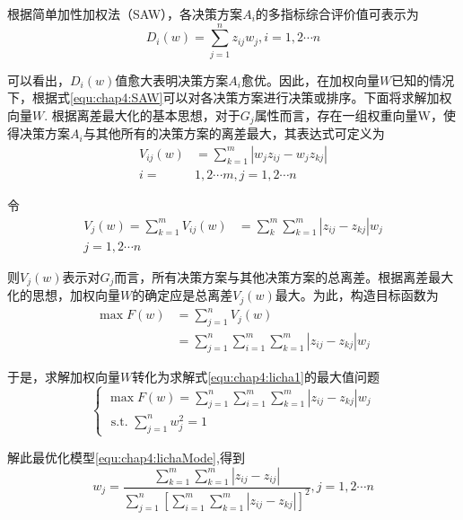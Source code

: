 根据简单加性加权法（SAW），各决策方案$A_i$的多指标综合评价值可表示为
\begin{equation}
\label{equ:chap4:SAW}
  D_i(w) = \sum_{j = 1}^{n} z_{ij}w_{j} , i=1,2 \cdots n
\end{equation}

可以看出，$D_i(w)$值愈大表明决策方案$A_i$愈优。因此，在加权向量$W$已知的情况下，根据式\ref{equ:chap4:SAW}可以对各决策方案进行决策或排序。下面将求解加权向量$W$.
根据离差最大化的基本思想，对于$G_j$属性而言，存在一组权重向量W，使得决策方案$A_{i}$与其他所有的决策方案的离差最大，其表达式可定义为
\begin{equation}
\begin{aligned} V_{i j}(w) &=\sum_{k=1}^{m}\left|w_{j} z_{i j}-w_{j} z_{k j}\right| \\ i=& 1,2 \cdots m, j=1,2 \cdots n \end{aligned}
\end{equation}

令
\begin{equation}
\begin{aligned} V_{j}(w)=\sum_{k=1}^{m} V_{i j}(w) &=\sum_{k}^{m} \sum_{k=1}^{m}\left|z_{i j}-z_{k j}\right| w_{j} \\ j=1,2 \cdots n \end{aligned}
\end{equation}

则$V_{j}(w)$表示对$G_{j}$而言，所有决策方案与其他决策方案的总离差。根据离差最大化的思想，加权向量$W$的确定应是总离差$V_{j}(w)$最大。为此，构造目标函数为
\begin{equation}
\label{equ:chap4:licha1}
\begin{aligned} \max F(w) &=\sum_{j=1}^{n} V_{j}(w) \\ &=\sum_{j=1}^{n} \sum_{i=1}^{m} \sum_{k=1}^{m}\left|z_{i j}-z_{k j}\right| w_{j} \end{aligned}
\end{equation}

于是，求解加权向量$W$转化为求解式\ref{equ:chap4:licha1}的最大值问题
\begin{equation}
\label{equ:chap4:lichaMode}
\left\{\begin{array}{l}{\max F(w)=\sum_{j=1}^{n} \sum_{i=1}^{m} \sum_{k=1}^{m}\left|z_{i j}-z_{k j}\right| w_{j}} \\ 
{\text { s.t. } \sum_{j=1}^{n} w_{j}^{2}=1}\end{array}\right.
\end{equation}

解此最优化模型\ref{equ:chap4:lichaMode},得到
\begin{equation}
  w_{j}=\frac{\sum_{k=1}^{m} \sum_{k=1}^{m}\left|z_{i j}-z_{i j}\right|}{\sum_{j=1}^{n}\left[\sum_{i=1}^{m} \sum_{k=1}^{m} | z_{ij}-z_{k j} | \right]^{2}}, j=1,2 \cdots n
  \end{equation}

